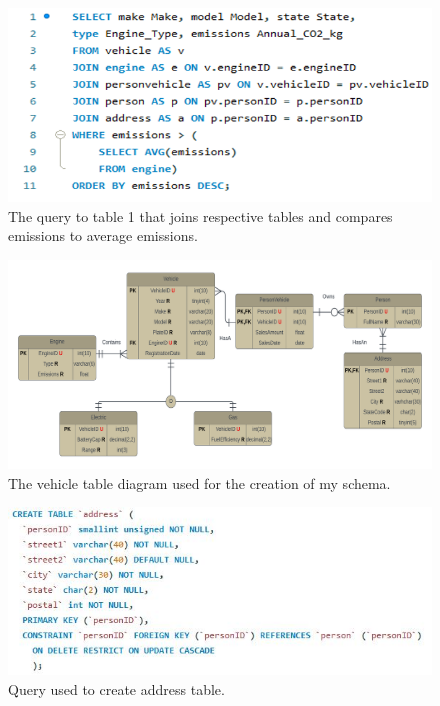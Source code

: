 \documentclass[12pt,letterpaper]{article}
\begin{document}
	\begin{figure}[ht]  
		\begin{center}
			\includegraphics[width=\textwidth]{q.jpg}
		\end{center}
		\caption{\label{q} The query to table 1 that joins respective tables and compares emissions to average emissions.}
	\end{figure}
	\pagebreak
	\begin{figure}[ht]  
		\begin{center}
			\includegraphics[width=\textwidth]{tdia.jpg}
		\end{center}
		\caption{\label{table} The vehicle table diagram used for the creation of my schema.}
	\end{figure}
	\pagebreak
	\begin{figure}[ht]  
		\begin{center}
			\includegraphics[width=\textwidth]{address.jpg}
		\end{center}
		\caption{\label{address} Query used to create address table.}
	\end{figure}
\end{document}
